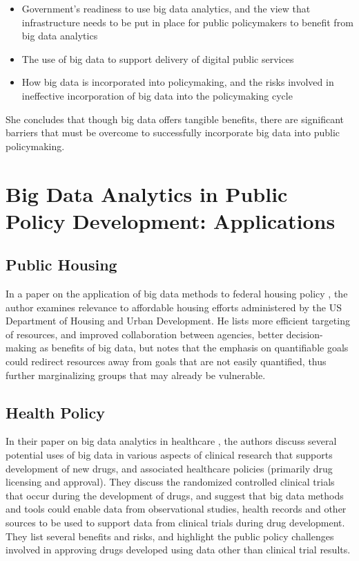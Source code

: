 \documentclass[sigconf]{acmart}
\begin{document}
\begin{itemize}
   \item Government's readiness to use big data analytics, and the view that infrastructure needs to be put in place for public policymakers to benefit from big data analytics
   \item The use of big data to support delivery of digital public services
   \item How big data is incorporated into policymaking, and the risks involved in ineffective incorporation of big data into the policymaking cycle
\end{itemize}

She concludes that though big data offers tangible benefits, there are significant barriers that must be overcome to successfully incorporate big data into public policymaking.

\section{Big Data Analytics in Public Policy Development: Applications}
\subsection{Public Housing}
In a paper on the application of big data methods to federal housing policy \cite{davidson_2017}, the author examines relevance to affordable housing efforts administered by the US Department of Housing and Urban Development. He lists more efficient targeting of resources, and improved collaboration between agencies, better decision-making as benefits of big data, but notes that the emphasis on quantifiable goals could redirect resources away from goals that are not easily quantified, thus further marginalizing groups that may already be vulnerable.

\subsection{Health Policy}
In their paper on big data analytics in healthcare \cite{alemayehu_2016}, the authors discuss several potential uses of big data in various aspects of clinical research that supports development of new drugs, and associated healthcare policies (primarily drug licensing and approval). They discuss the randomized controlled clinical trials that occur during the development of drugs, and suggest that big data methods and tools could enable data from observational studies, health records and other sources to be used to support data from clinical trials during drug development. They list several benefits and risks, and highlight the public policy challenges involved in approving drugs developed using data other than clinical trial results.
\end{document}
